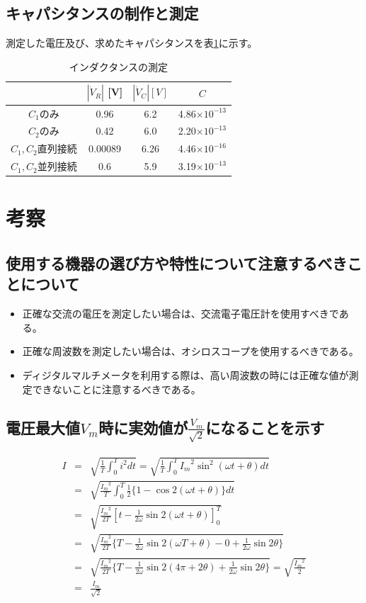\documentclass[dvipdfmx]{jsarticle}
\begin{document}
\subsection{キャパシタンスの制作と測定}
測定した電圧及び、求めたキャパシタンスを表\ref{tb:result10}に示す。
\begin{table}[h]
  \centering
  \caption{インダクタンスの測定}
  \label{tb:result10}
  \begin{tabular}{|c|c|c|c|}\hline
    & $|\dot V_R|$ [V] & $|\dot V_C| [V]$ & $C$\\ \hline
    $C_1$のみ & 0.96 & 6.2 & 4.86$\times 10^{-13}$\\ \hline
    $C_2$のみ & 0.42 & 6.0 & 2.20$\times 10^{-13}$\\ \hline
    $C_1, C_2$直列接続 & 0.00089 & 6.26 & 4.46$\times 10^{-16}$\\ \hline
    $C_1, C_2$並列接続 & 0.6 & 5.9 & 3.19$\times 10^{-13}$\\ \hline
  \end{tabular}
\end{table}

\section{考察}
\subsection{使用する機器の選び方や特性について注意するべきことについて}
\begin{itemize}
  \item 正確な交流の電圧を測定したい場合は、交流電子電圧計を使用すべきである。
  \item 正確な周波数を測定したい場合は、オシロスコープを使用するべきである。
  \item ディジタルマルチメータを利用する際は、高い周波数の時には正確な値が測定できないことに注意するべきである。
\end{itemize}

\subsection{電圧最大値$V_m$時に実効値が$\frac{V_m}{\sqrt{2}}$になることを示す}
\begin{eqnarray}
  I & = & \sqrt{\frac{1}{T} \int_0^T i^2 dt} = \sqrt{\frac{1}{T} \int_0^T {I_m}^2\sin^2(\omega t + \theta) dt}\nonumber \\
 & = &\sqrt{\frac{{I_m}^2}{T} \int_0^T \frac{1}{2} \{1 - \cos2(\omega t + \theta)\} dt}\nonumber \\
 & = & \sqrt{\frac{{I_m}^2}{2T} \left[t - \frac{1}{2\omega}\sin2(\omega t + \theta)\right]_0^T}\nonumber \\
 & = & \sqrt{\frac{{I_m}^2}{2T} \{T - \frac{1}{2\omega}\sin2(\omega T + \theta) - 0 + \frac{1}{2\omega}\sin2\theta\}}\nonumber \\
 & = & \sqrt{\frac{{I_m}^2}{2T} \{T - \frac{1}{2\omega}\sin2(4\pi + 2\theta) + \frac{1}{2\omega}\sin2\theta\}} = \sqrt{\frac{{I_m}^2}{2}}\nonumber  \\
 & = & \frac{I_m}{\sqrt{2}}\nonumber 
\end{eqnarray}
\end{document}
